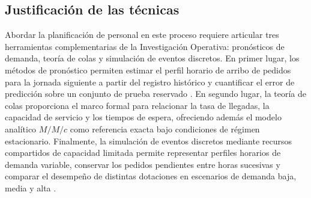 \subsection{Justificación de las técnicas}
Abordar la planificación de personal en este proceso requiere articular tres herramientas complementarias de la Investigación Operativa: pronósticos de demanda, teoría de colas y simulación de eventos discretos.
En primer lugar, los métodos de pronóstico permiten estimar el perfil horario de arribo de pedidos para la jornada siguiente a partir del registro histórico y cuantificar el error de predicción sobre un conjunto de prueba reservado \cite{hyndman_athanasopoulos_fpp3}.
En segundo lugar, la teoría de colas proporciona el marco formal para relacionar la tasa de llegadas, la capacidad de servicio y los tiempos de espera, ofreciendo además el modelo analítico $M/M/c$ como referencia exacta bajo condiciones de régimen estacionario.
Finalmente, la simulación de eventos discretos mediante recursos compartidos de capacidad limitada permite representar perfiles horarios de demanda variable, conservar los pedidos pendientes entre horas sucesivas y comparar el desempeño de distintas dotaciones en escenarios de demanda baja, media y alta \cite{simpy_shared_resources}.
